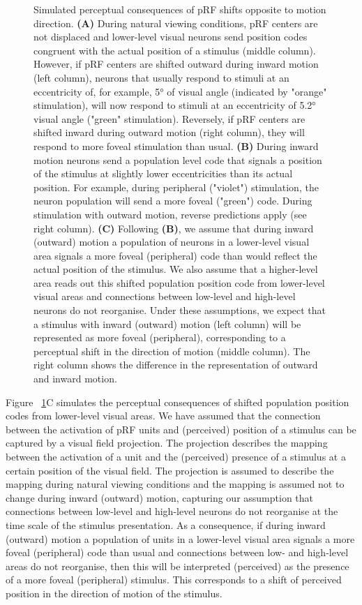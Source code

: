\begin{figure}[htb!]
\ContinuedFloat
\captionsetup{labelformat=adja-page}
\caption{Simulated perceptual consequences of pRF shifts opposite to motion direction. \textbf{(A)} During natural viewing conditions, pRF centers are not displaced and lower-level visual neurons send position codes congruent with the actual position of a stimulus (middle column). However, if pRF centers are shifted outward during inward motion (left column), neurons that usually respond to stimuli at an eccentricity of, for example, 5° of visual angle (indicated by "orange" stimulation), will now respond to stimuli at an eccentricity of 5.2° visual angle ("green" stimulation). Reversely, if pRF centers are shifted inward during outward motion (right column), they will respond to more foveal stimulation than usual. \textbf{(B)} During inward motion neurons send a population level code that signals a position of the stimulus at slightly lower eccentricities than its actual position. For example, during peripheral ("violet") stimulation, the neuron population will send a more foveal ("green") code.  During stimulation with outward motion, reverse predictions apply (see right column). \textbf{(C)} Following \textbf{(B)}, we assume that during inward (outward) motion a population of neurons in a lower-level visual area signals a more foveal (peripheral) code than would reflect the actual position of the stimulus. We also assume that a higher-level area reads out this shifted population position code from lower-level visual areas and connections between low-level and high-level neurons do not reorganise. Under these assumptions, we expect that a stimulus with inward (outward) motion (left column) will be represented as more foveal (peripheral), corresponding to a perceptual shift in the direction of motion (middle column). The right column shows the difference in the representation of outward and inward motion.}
\label{fig:modelOv}
\noindent\hrulefill
\end{figure}

Figure ~\ref{fig:modelOv}C simulates the perceptual consequences of shifted population position codes from lower-level visual areas. We have assumed that the connection between the activation of pRF units and (perceived) position of a stimulus can be captured by a visual field projection. The projection describes the mapping between the activation of a unit and the (perceived) presence of a stimulus at a certain position of the visual field. The projection is assumed to describe the mapping during natural viewing conditions and the mapping is assumed not to change during inward (outward) motion, capturing our assumption that connections between low-level and high-level neurons do not reorganise at the time scale of the stimulus presentation. As a consequence, if during inward (outward) motion a population of units in a lower-level visual area signals a more foveal (peripheral) code than usual and connections between low- and high-level areas do not reorganise, then this will be interpreted (perceived) as the presence of a more foveal (peripheral) stimulus. This corresponds to a shift of perceived position in the direction of motion of the stimulus.

